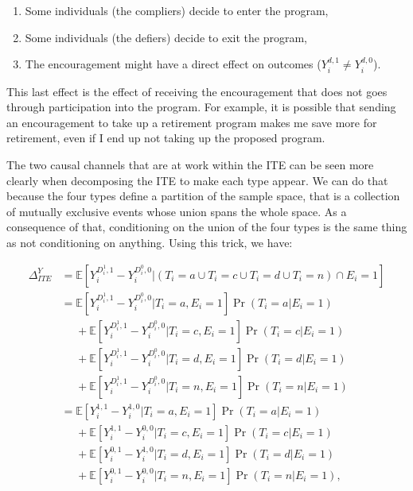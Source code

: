 \documentclass[]{book}
\providecommand{\tightlist}{%
  \setlength{\itemsep}{0pt}\setlength{\parskip}{0pt}}
\newcommand{\esp}[1]{\mathbb{E}[ #1 ]}
\theoremstyle{definition}
\theoremstyle{definition}
\theoremstyle{definition}
\theoremstyle{remark}
\begin{document}
\begin{enumerate}
\def\labelenumi{\arabic{enumi}.}
\tightlist
\item
  Some individuals (the compliers) decide to enter the program,
\item
  Some individuals (the defiers) decide to exit the program,
\item
  The encouragement might have a direct effect on outcomes
  (\(Y_i^{d,1}\neq Y_i^{d,0}\)).
\end{enumerate}

This last effect is the effect of receiving the encouragement that does
not goes through participation into the program. For example, it is
possible that sending an encouragement to take up a retirement program
makes me save more for retirement, even if I end up not taking up the
proposed program.

The two causal channels that are at work within the ITE can be seen more
clearly when decomposing the ITE to make each type appear. We can do
that because the four types define a partition of the sample space, that
is a collection of mutually exclusive events whose union spans the whole
space. As a consequence of that, conditioning on the union of the four
types is the same thing as not conditioning on anything. Using this
trick, we have:

\begin{align}
  \Delta^Y_{ITE} & = \esp{Y_i^{D_i^1,1}-Y_i^{D_i^0,0}|(T_i=a\cup T_i=c\cup T_i=d\cup T_i=n)\cap E_i=1}\nonumber\\
                & = \esp{Y_i^{D_i^1,1}-Y_i^{D_i^0,0}|T_i=a,E_i=1}\Pr(T_i=a|E_i=1)\nonumber\\
                & \phantom{=}+ \esp{Y_i^{D_i^1,1}-Y_i^{D_i^0,0}|T_i=c,E_i=1}\Pr(T_i=c|E_i=1)\nonumber\\
                & \phantom{=}+ \esp{Y_i^{D_i^1,1}-Y_i^{D_i^0,0}|T_i=d,E_i=1}\Pr(T_i=d|E_i=1)\nonumber\\
                & \phantom{=}+ \esp{Y_i^{D_i^1,1}-Y_i^{D_i^0,0}|T_i=n,E_i=1}\Pr(T_i=n|E_i=1)\nonumber\\
                & = \esp{Y_i^{1,1}-Y_i^{1,0}|T_i=a,E_i=1}\Pr(T_i=a|E_i=1)\nonumber\\
                & \phantom{=}+ \esp{Y_i^{1,1}-Y_i^{0,0}|T_i=c,E_i=1}\Pr(T_i=c|E_i=1)\nonumber\\
                & \phantom{=}+ \esp{Y_i^{0,1}-Y_i^{1,0}|T_i=d,E_i=1}\Pr(T_i=d|E_i=1)\nonumber\\
                & \phantom{=}+ \esp{Y_i^{0,1}-Y_i^{0,0}|T_i=n,E_i=1}\Pr(T_i=n|E_i=1),\label{eq:ITE3}
\end{align}
\end{document}
